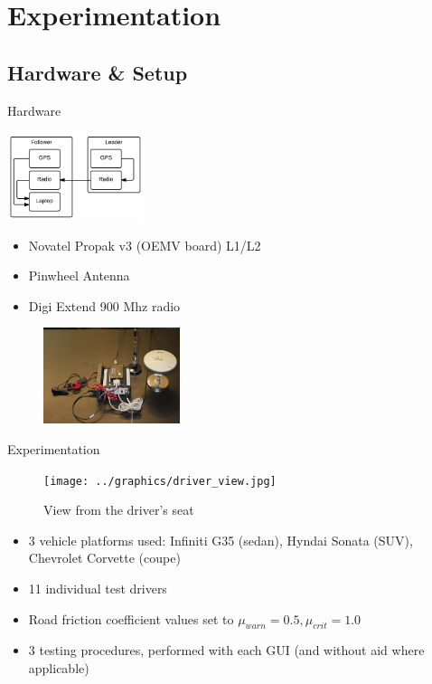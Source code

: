 \documentclass{beamer}
\begin{document}
\section{Experimentation}

  \subsection{Hardware \& Setup}

    \begin{frame}{Hardware}
        \begin{minipage}{0.45\textwidth}
          \centering
          \includegraphics[width=4cm]{../graphics/hardware_flow.png}
        \end{minipage}
        \begin{minipage}{0.45\textwidth}
          \begin{itemize}
            \item Novatel Propak v3 (OEMV board) L1/L2
            \item Pinwheel Antenna
            \item Digi Extend 900 Mhz radio
          \end{itemize}
        \end{minipage}
        \begin{figure}
          \includegraphics[width=4cm]{../graphics/lead_hardware.jpg}
        \end{figure}
    \end{frame}

    \begin{frame}{Experimentation}
      \begin{figure}[ht] \centering
        \texttt{[image: ../graphics/driver\_view.jpg]}
        \caption{\scriptsize View from the driver's seat}
      \end{figure}
      \vspace{-20pt}
      \begin{itemize} \footnotesize
        \item 3 vehicle platforms used: Infiniti G35 (sedan), Hyndai Sonata (SUV), Chevrolet Corvette (coupe)
        \item 11 individual test drivers
        \item Road friction coefficient values set to $\mu_{warn}=0.5,\mu_{crit}=1.0$
        \item 3 testing procedures, performed with each GUI (and without aid where applicable)
      \end{itemize}
    \end{frame}
\end{document}
